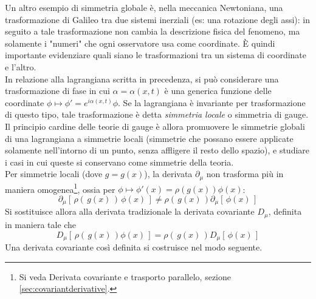 Un altro esempio di simmetria globale è, nella meccanica Newtoniana, una
trasformazione di Galileo tra due sistemi inerziali (es: una rotazione degli assi):
in seguito a tale trasformazione non cambia la descrizione fisica del fenomeno,
ma solamente i "numeri" che ogni osservatore usa come coordinate. È quindi importante
evidenziare quali siano le trasformazioni tra un sistema di coordinate e l'altro.\\


In relazione alla lagrangiana scritta in precedenza, si può considerare una trasformazione
di fase in cui $\alpha = \alpha(x,t)$ è una generica funzione delle coordinate
$\phi \mapsto \phi' = e^{i\alpha(x,t)}\phi$. Se la lagrangiana è invariante per
trasformazione di questo tipo, tale trasformazione è detta \emph{simmetria locale}
o simmetria di gauge.\\

Il principio cardine delle teorie di gauge è allora promuovere le simmetrie globali
di una lagrangiana a simmetrie locali (simmetrie che possano essere applicate
solamente nell'intorno di un punto, senza affligere il resto dello spazio), e studiare
i casi in cui queste si conservano come simmetrie della teoria. \\

Per simmetrie locali (dove $g = g(x)$), la derivata $\partial _\mu$ non trasforma
più in maniera omogenea\footnote{
    Si veda Derivata covariante e trasporto parallelo, sezione \ref{sec:covariantderivative}.
}, ossia per $\phi \mapsto \phi'(x) = \rho(g(x))\phi(x)$:
$$
   \partial _\mu [\, \rho(\, g(x) \,) \, \phi(x)\, ]
       \neq  \rho(\, g(x) \,) \partial _\mu [\, \phi(x) \,]
$$
Si sostituisce allora alla derivata tradizionale la derivata covariante $D _\mu$,
definita in maniera tale che
\begin{equation}\label{eq:covdercondition}
   D _\mu[\, \rho(\, g(x) \,) \phi(x) \,] = \rho(\, g(x) \,) D _\mu[\, \phi(x) \,]
\end{equation}
Una derivata covariante così definita si costruisce nel modo seguente.\\


